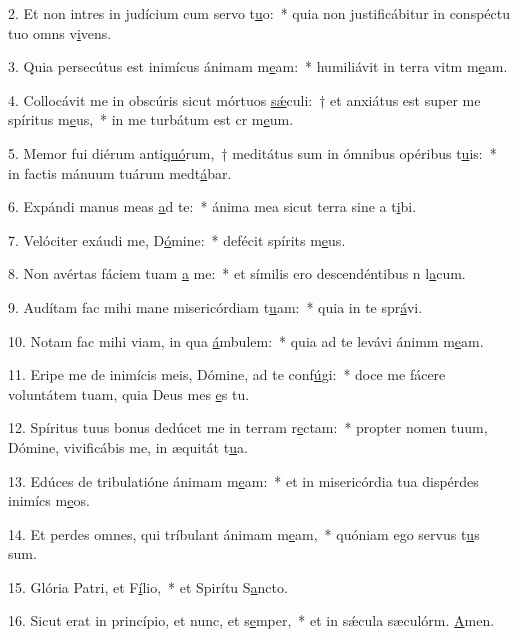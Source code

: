 2. Et non intres in judícium cum servo t\uline{u}o:~* quia non justificábitur in conspéctu tuo omns v\uline{i}vens.\par 
3. Quia persecútus est inimícus ánimam m\uline{e}am:~* humiliávit in terra vitm m\uline{e}am.\par 
4. Collocávit me in obscúris sicut mórtuos \uline{sǽ}culi:~† et anxiátus est super me spíritus m\uline{e}us,~* in me turbátum est cr m\uline{e}um.\par 
5. Memor fui diérum anti\uline{quó}rum,~† meditátus sum in ómnibus opéribus t\uline{u}is:~* in factis mánuum tuárum medt\uline{á}bar.\par 
6. Expándi manus meas \uline{a}d te:~* ánima mea sicut terra sine a t\uline{i}bi.\par 
7. Velóciter exáudi me, D\uline{ó}mine:~* defécit spírits m\uline{e}us.\par 
8. Non avértas fáciem tuam \uline{a} me:~* et símilis ero descendéntibus n l\uline{a}cum.\par 
9. Audítam fac mihi mane misericórdiam t\uline{u}am:~* quia in te spr\uline{á}vi.\par 
10. Notam fac mihi viam, in qua \uline{á}mbulem:~* quia ad te levávi ánimm m\uline{e}am.\par 
11. Eripe me de inimícis meis, Dómine, ad te conf\uline{ú}gi:~* doce me fácere voluntátem tuam, quia Deus mes \uline{e}s tu.\par 
12. Spíritus tuus bonus dedúcet me in terram r\uline{e}ctam:~* propter nomen tuum, Dómine, vivificábis me, in æquitát t\uline{u}a.\par 
13. Edúces de tribulatióne ánimam m\uline{e}am:~* et in misericórdia tua dispérdes inimícs m\uline{e}os.\par 
14. Et perdes omnes, qui tríbulant ánimam m\uline{e}am,~* quóniam ego servus t\uline{u}s sum.\par 
15. Glória Patri, et F\uline{í}lio,~* et Spirítu S\uline{a}ncto.\par 
16. Sicut erat in princípio, et nunc, et s\uline{e}mper,~* et in sǽcula sæculórm. \uline{A}men.\par 
